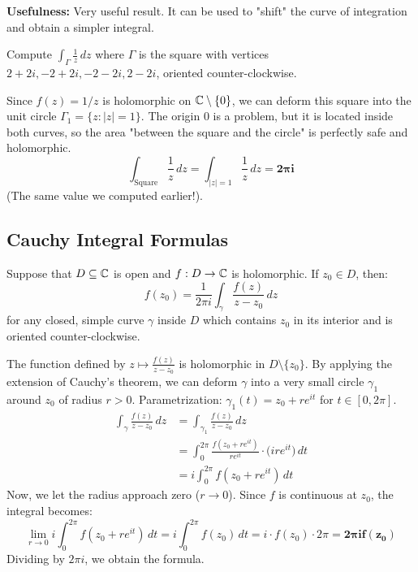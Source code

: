 \textbf{Usefulness:} Very useful result. It can be used to "shift" the curve of integration and obtain a simpler integral.

\begin{example}
Compute $\int_{\Gamma} \frac{1}{z} \, dz$ where $\Gamma$ is the square with vertices $2+2i, -2+2i, -2-2i, 2-2i$, oriented counter-clockwise.

Since $f(z) = 1/z$ is holomorphic on $\mathbb{C} \setminus \{0\}$, we can deform this square into the unit circle $\Gamma_1 = \{ z : |z| = 1 \}$. The origin $0$ is a problem, but it is located inside both curves, so the area "between the square and the circle" is perfectly safe and holomorphic.
\[
\int_{\text{Square}} \frac{1}{z} \, dz = \int_{|z|=1} \frac{1}{z} \, dz = \mathbf{2\pi i}
\]
(The same value we computed earlier!).
\end{example}

\subsection{Cauchy Integral Formulas}

\begin{theorem}
Suppose that $D \subseteq \mathbb{C}$ is open and $f : D \rightarrow \mathbb{C}$ is holomorphic. If $z_0 \in D$, then:
\[
f(z_0) = \frac{1}{2\pi i} \int_{\gamma} \frac{f(z)}{z - z_0} \, dz
\]
for any closed, simple curve $\gamma$ inside $D$ which contains $z_0$ in its interior and is oriented counter-clockwise.
\end{theorem}

\begin{proofbox}
The function defined by $z \mapsto \frac{f(z)}{z - z_0}$ is holomorphic in $D \setminus \{z_0\}$.
By applying the extension of Cauchy's theorem, we can deform $\gamma$ into a very small circle $\gamma_1$ around $z_0$ of radius $r > 0$.
Parametrization: $\gamma_1(t) = z_0 + r e^{it}$ for $t \in [0, 2\pi]$.
\begin{align*}
\int_{\gamma} \frac{f(z)}{z - z_0} \, dz &= \int_{\gamma_1} \frac{f(z)}{z - z_0} \, dz \\
&= \int_0^{2\pi} \frac{f(z_0 + r e^{it})}{r e^{it}} \cdot \Big( i r e^{it} \Big) \, dt \\
&= i \int_0^{2\pi} f(z_0 + r e^{it}) \, dt
\end{align*}
Now, we let the radius approach zero ($r \rightarrow 0$). Since $f$ is continuous at $z_0$, the integral becomes:
\[
\lim_{r \to 0} i \int_0^{2\pi} f(z_0 + r e^{it}) \, dt = i \int_0^{2\pi} f(z_0) \, dt = i \cdot f(z_0) \cdot 2\pi = \mathbf{2\pi i f(z_0)}
\]
Dividing by $2\pi i$, we obtain the formula.
\end{proofbox}